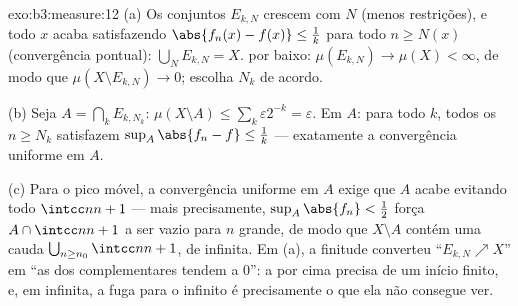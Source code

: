\begin{solution}{exo:b3:measure:12}
(a) Os conjuntos $E_{k,N}$ crescem com $N$ (menos
restrições), e todo $x$ acaba satisfazendo $\abs{f_n(x)
- f(x)} \leq \frac1k$ para todo $n \geq N(x)$ (convergência
pontual): $\bigcup_NE_{k,N} = X$.  por baixo:
$\mu(E_{k,N}) \to \mu(X) < \infty$, de modo que $\mu(X\setminus
E_{k,N}) \to 0$; escolha $N_k$ de acordo.

(b) Seja $A = \bigcap_kE_{k,N_k}$: $\mu(X\setminus A) \leq
\sum_k\varepsilon2^{-k} = \varepsilon$. Em $A$: para todo
$k$, todos os $n \geq N_k$ satisfazem $\sup_A\abs{f_n - f} \leq
\frac1k$ --- exatamente a convergência uniforme em $A$.

(c) Para o pico móvel, a convergência uniforme em $A$ exige
que $A$ acabe evitando todo $\intcc n{n+1}$ --- mais
precisamente, $\sup_A\abs{f_n} < \frac12$ força $A \cap \intcc
n{n+1}$ a ser vazio para $n$ grande, de modo que $X \setminus A$
contém uma cauda $\bigcup_{n\geq n_0}\intcc n{n+1}$, de
 infinita. Em (a), a finitude converteu
``$E_{k,N}\nearrow X$'' em ``as  dos complementares
tendem a $0$'': a  por cima precisa de um início finito,
e, em  infinita, a fuga para o infinito é
precisamente o que ela não consegue ver.
\end{solution}

